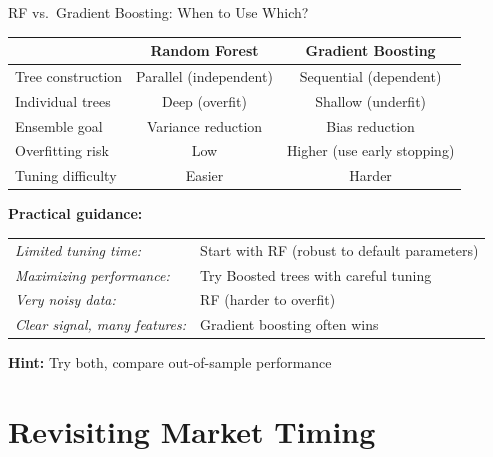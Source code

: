 \documentclass[10pt]{beamer}
\begin{document}
\begin{frame}{RF vs.\ Gradient Boosting: When to Use Which?}

  \begin{center}
  \begin{tabular}{lcc}
    \toprule
    & \textbf{Random Forest} & \textbf{Gradient Boosting} \\
    \midrule
    Tree construction & Parallel (independent) & Sequential (dependent) \\
    Individual trees & Deep (overfit) & Shallow (underfit) \\
    Ensemble goal & Variance reduction & Bias reduction \\
    Overfitting risk & Low & Higher (use early stopping) \\
    Tuning difficulty & Easier & Harder \\
    \bottomrule
  \end{tabular}
  \end{center}

  \vspace{1em}
  \textbf{Practical guidance:}

  \vspace{0.3em}
  \begin{tabular}{ll}
    \textit{Limited tuning time:} & Start with RF (robust to default parameters) \\
    \textit{Maximizing performance:} & Try Boosted trees with careful tuning \\
    \textit{Very noisy data:} & RF (harder to overfit) \\
    \textit{Clear signal, many features:} & Gradient boosting often wins \\
  \end{tabular}

  \vspace{1em}
  \textbf{Hint:} Try both, compare out-of-sample performance
\end{frame}

\section{Revisiting Market Timing}
\end{document}
